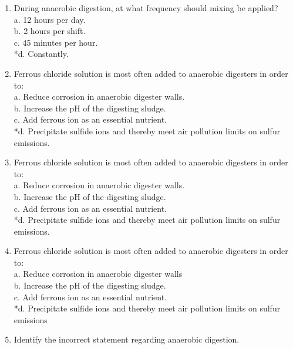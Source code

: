 \documentclass{article}
\begin{document}
\begin{enumerate}
\item  During anaerobic digestion, at what frequency should mixing be applied? \\

a. 12 hours per day. \\
b. 2 hours per shift. \\
c. 45 minutes per hour. \\
*d. Constantly. \\

\item  Ferrous chloride solution is most often added to anaerobic digesters in order to: \\

a. Reduce corrosion in anaerobic digester walls. \\
b. Increase the pH of the digesting sludge. \\
c. Add ferrous ion as an essential nutrient. \\
*d. Precipitate sulfide ions and thereby meet air pollution limits on sulfur emissions. \\

\item  Ferrous chloride solution is most often added to anaerobic digesters in order to: \\

a. Reduce corrosion in anaerobic digester walls. \\
b. Increase the pH of the digesting sludge. \\
c. Add ferrous ion as an essential nutrient. \\
*d. Precipitate sulfide ions and thereby meet air pollution limits on sulfur emissions. \\

\item  Ferrous chloride solution is most often added to anaerobic digesters in order to: \\

a. Reduce corrosion in anaerobic digester walls \\
b. Increase the pH of the digesting sludge. \\
c. Add ferrous ion as an essential nutrient. \\
*d. Precipitate sulfide ions and thereby meet air pollution limits on sulfur emissions \\

\item  Identify the incorrect statement regarding anaerobic digestion. \\


\end{enumerate}
\end{document}
